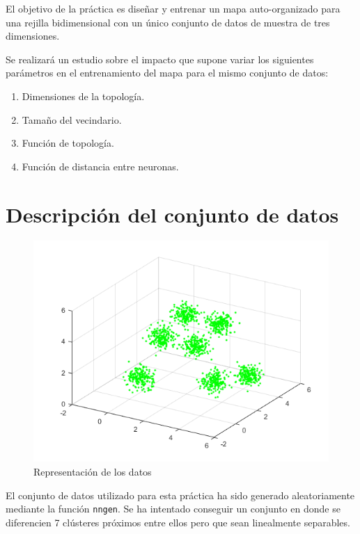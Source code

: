 \documentclass[a4paper,12pt,titlepage]{article}
\begin{document}
El objetivo de la práctica es diseñar y entrenar un mapa auto-organizado para una rejilla bidimensional con un único conjunto de datos de muestra de tres dimensiones. 

Se realizará un estudio sobre el impacto que supone variar los siguientes parámetros en el entrenamiento del mapa para el mismo conjunto de datos:

\begin{enumerate}[noitemsep]
	\item Dimensiones de la topología.
	\item Tamaño del vecindario.
	\item Función de topología.
	\item Función de distancia entre neuronas.
\end{enumerate}

\section{Descripción del conjunto de datos}

\begin{figure}[!ht]
	\centering
	\label{fig:patternnet}
	\includegraphics[width=\textwidth]{datos.png}
	\caption{Representación de los datos}
\end{figure}

El conjunto de datos utilizado para esta práctica ha sido generado aleatoriamente mediante la función \lstinline|nngen|. Se ha intentado conseguir un conjunto en donde se diferencien 7 clústeres próximos entre ellos pero que sean linealmente separables.
\end{document}
